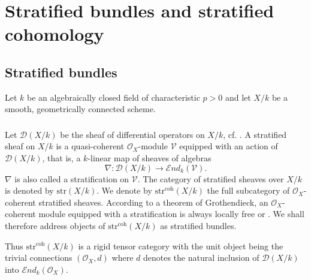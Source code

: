 \documentclass[12pt,a4]{amsart}
\theoremstyle{definition}
\begin{document}
 

 

\section{Stratified bundles and stratified cohomology}
\label{sect_str_bundles}

\subsection{Stratified bundles} 
Let $k$ be an algebraically closed field of characteristic $p>0$ 
and let $X/k$ be a smooth, geometrically connected  scheme. 
\subsubsection{} \label{sect_2.1.1}
Let $\mathcal{D}(X/k)$ be  the sheaf of differential 
operators on $X/k$, cf. \cite[IV.16.8]{EGA4}.
A stratified sheaf on $X/k$ is a quasi-coherent $\mathcal O_X$-module $\mathcal V$ equipped 
with an action of $\mathcal D (X/k)$, that is, a $k$-linear map of sheaves of algebras
$$\nabla:\mathcal D (X/k)\longrightarrow \mathcal{E}\textit{nd}_k(\mathcal V).$$
$\nabla$ is also called a stratification on $\mathcal V$. 
The category of stratified sheaves over $X/k$ is denoted by $\mathrm{str}(X/k).$
We denote by $\mathrm{str}^\mathrm{coh}(X/k)$ the full subcategory of $\mathcal O_X$-coherent
stratified sheaves. According to a theorem of Grothendieck, an $\mathcal O_X$-coherent
module equipped with a stratification is always locally free \cite[Prop.~2.16]{BO78} or \cite[Lemma~6]{dSa07}.  
We shall therefore address objects of $\mathrm{str}^\mathrm{coh}(X/k)$ as stratified bundles. 

Thus $\mathrm{str}^\mathrm{coh}(X/k)$ is a rigid tensor category
with the unit object being the trivial connections $(\mathcal O_X,d)$
where $d$ denotes the natural inclusion of $\mathcal D (X/k)$ into
$\mathcal E\textit{nd}_k(\mathcal O_X).$
\end{document}
